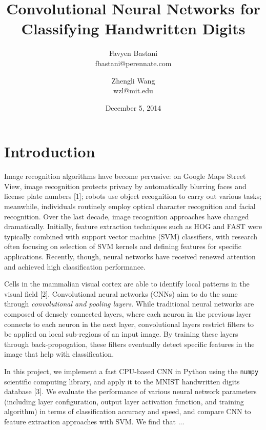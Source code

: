 \documentclass[12pt,twocolumn]{article}
\title{Convolutional Neural Networks for Classifying Handwritten Digits}
\date{December 5, 2014}
\author{
	Favyen Bastani \\
	fbastani@perennate.com
	\and
	Zhengli Wang \\
	wzl@mit.edu
}
\begin{document}
\maketitle

\section{Introduction} \label{sec:introduction}

Image recognition algorithms have become pervasive: on Google Maps Street View, image recognition protects privacy by automatically blurring faces and license plate numbers [1]; robots use object recognition to carry out various tasks; meanwhile, individuals routinely employ optical character recognition and facial recognition. Over the last decade, image recognition approaches have changed dramatically. Initially, feature extraction techniques such as HOG and FAST were typically combined with support vector machine (SVM) classifiers, with research often focusing on selection of SVM kernels and defining features for specific applications. Recently, though, neural networks have received renewed attention and achieved high classification performance.


Cells in the mammalian visual cortex are able to identify local patterns in the visual field [2]. Convolutional neural networks (CNNs) aim to do the same through \emph{convolutional and pooling layers}. While traditional neural networks are composed of densely connected layers, where each neuron in the previous layer connects to each neuron in the next layer, convolutional layers restrict filters to be applied on local sub-regions of an input image. By training these layers through back-propogation, these filters eventually detect specific features in the image that help with classification.


In this project, we implement a fast CPU-based CNN in Python using the \texttt{numpy} scientific computing library, and apply it to the MNIST handwritten digits database [3]. We evaluate the performance of various neural network parameters (including layer configuration, output layer activation function, and training algorithm) in terms of classification accuracy and speed, and compare CNN to feature extraction approaches with SVM. We find that ...

\end{document}
